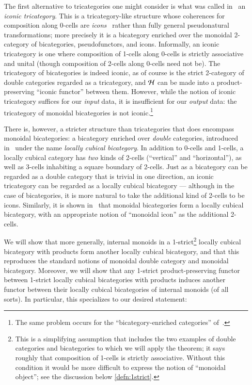 The first alternative to tricategories one might consider is what was called in~\cite{shulman:psalg} an \emph{iconic tricategory}.
This is a tricategory-like structure whose coherences for composition along 0-cells are \emph{icons}~\cite{lack:icons} rather than fully general pseudonatural transformations; more precisely it is a bicategory enriched over the monoidal 2-category of bicategories, pseudofunctors, and icons.
Informally, an iconic tricategory is one where composition of 1-cells along 0-cells is strictly associative and unital (though composition of 2-cells along 0-cells need not be).
The tricategory of bicategories is indeed iconic, as of course is the strict 2-category of double categories regarded as a tricategory, and $\mathcal{H}$ can be made into a product-preserving ``iconic functor'' between them.
However, while the notion of iconic tricategory suffices for our \emph{input} data, it is insufficient for our \emph{output} data: the tricategory of monoidal bicategories is not iconic.\footnote{The same problem occurs for the ``bicategory-enriched categories'' of~\cite{verity:base-change}.}

There is, however, a stricter structure than tricategories that does encompass monoidal bicategories: a bicategory enriched over \emph{double} categories, introduced in~\cite{gg:ldstr-tricat} under the name \emph{locally cubical bicategory}.
In addition to 0-cells and 1-cells, a locally cubical category has \emph{two} kinds of 2-cells (``vertical'' and ``horizontal''), as well as 3-cells inhabiting a square boundary of 2-cells.
Just as a bicategory can be regarded as a double category that is trivial in one direction, an iconic tricategory can be regarded as a locally cubical bicategory --- although in the case of bicategories, it is more natural to take the additional kind of 2-cells to be icons.
Similarly, it is shown in~\cite{gg:ldstr-tricat} that monoidal bicategories form a locally cubical bicategory, with an appropriate notion of ``monoidal icon'' as the additional 2-cells.

We will show that more generally, internal monoids in a 1-strict\footnote{This is a simplifying assumption that includes the two examples of double categories and bicategories to which we will apply the theorem; it says roughly that composition of 1-cells is strictly associative.
  Without this condition it would be more difficult to express the notion of ``monoidal object''; see the discussion below \autoref{defn:1strict}.} locally cubical bicategory with products form another locally cubical bicategory, and that this reproduces the standard notions of monoidal double category and monoidal bicategory.
Moreover, we will show that any 1-strict product-preserving functor between 1-strict locally cubical bicategories with products induces another functor between their locally cubical bicategories of internal monoids (of all sorts).
In particular, this specializes to our desired statement:

